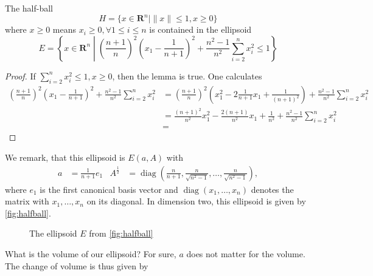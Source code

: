 \documentclass[10pt]{article}
\newcommand{\R}{\mathbf{R}}
\newcommand{\diag}{\operatorname{diag}}
\begin{document}
\begin{lemma}\label{lem:halfball}
The half-ball 
\[
H = \{x \in \R^n | \| x \| \le 1, x \ge 0 \}
\]
where $x \ge 0$ means $x_i \ge 0, \forall 1 \le i \le n$ is contained in the ellipsoid
\[
E = \left\{ x \in \R^n \middle| \left(\frac{n+1}{n}\right)^2\left(x_1 - \frac{1}{n+1}\right)^2 + \frac{n^2-1}{n^2} \sum_{i=2}^n x_i^2 \le 1 \right\}
\]
\end{lemma}
\begin{proof}
If $\sum_{i=2}^n x_i^2 \le 1, x \ge 0$, then the lemma is true. One calculates
\begin{align*}
\left(\frac{n+1}{n} \right)^2 \left(x_1-\frac{1}{n+1}\right)^2 + \frac{n^2-1}{n^2} \sum_{i=2}^n x_i^2 &= \left(\frac{n+1}{n} \right)^2 \left(x_1^2-2\frac{1}{n+1}x_1 + \frac{1}{(n+1)^2}\right) + \frac{n^2-1}{n^2} \sum_{i=2}^n x_i^2\\
&= \frac{(n+1)^2}{n^2} x_1^2-\frac{2(n+1)}{n^2}x_1 + \frac{1}{n^2} + \frac{n^2-1}{n^2} \sum_{i=2}^n x_i^2\\
&=%
\end{align*}
\end{proof}
We remark, that this ellipsoid is $E(a,A)$ with
\begin{align*}
a &= \frac{1}{n+1} e_1 &  A^{\frac{1}{2}}&= \diag \left(\frac{n}{n+1}, \frac{n}{\sqrt{n^2-1}}, \dots, \frac{n}{\sqrt{n^2-1}}\right),
\end{align*}
where $e_1$ is the first canonical basis vector and $\diag (x_1, \dots, x_n)$ denotes the matrix with $x_1, \dots, x_n$ on its diagonal. In dimension two, this ellipsoid is given by \autoref{fig:halfball}.
\begin{figure}
\centering
{}
\caption{The ellipsoid $E$ from \protect\autoref{fig:halfball}}
\label{fig:halfball}
\end{figure}
What is the volume of our ellipsoid? For sure, $a$ does not matter for the volume. The change of volume is thus given by
\end{document}
